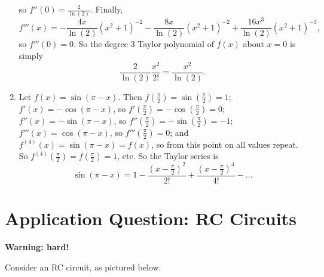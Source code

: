 \documentclass{article}
\begin{document}
\begin{enumerate}
			so $f''(0)=\frac{2}{\ln(2)}$. Finally,
			\[f'''(x)=-\frac{4x}{\ln(2)}(x^2+1)^{-2}-\frac{8x}{\ln(2)}(x^2+1)^{-2}+\frac{16x^3}{\ln(2)}(x^2+1)^{-3},\]
			so $f'''(0)=0$. So the degree 3 Taylor polynomial of $f(x)$ about $x=0$ is simply
			\[\frac{2}{\ln(2)}\frac{x^2}{2!}=\frac{x^2}{\ln(2)}.\]
	\item Let $f(x)=\sin(\pi-x)$. Then $f\left(\frac{\pi}{2}\right)=\sin\left(\frac{\pi}{2}\right) = 1$; $f'(x)=-\cos(\pi-x)$, so $f'\left(\frac{\pi}{2}\right)=-\cos\left(\frac{\pi}{2}\right)=0$; $f''(x)=-\sin(\pi-x)$, so $f''\left(\frac{\pi}{2}\right)=-\sin\left(\frac{\pi}{2}\right)=-1$; $f'''(x)=\cos(\pi-x)$, so $f'''\left(\frac{\pi}{2}\right)=0$; and $f^{(4)}(x)=\sin(\pi-x)=f(x)$, so from this point on all values repeat. So $f^{(4)}\left(\frac{\pi}{2}\right)=f\left(\frac{\pi}{2}\right)=1$, etc. So the Taylor series is
		\[\sin(\pi-x)=1-\frac{\left(x-\frac{\pi}{2}\right)^2}{2!}+\frac{\left(x-\frac{\pi}{2}\right)^4}{4!}-\hdots\]
\end{enumerate}









\clearpage


\section{Application Question: RC Circuits}

\textbf{Warning: hard!}\bigskip

















Consider an RC circuit, as pictured below.

\begin{center}
\end{center}
\end{document}
